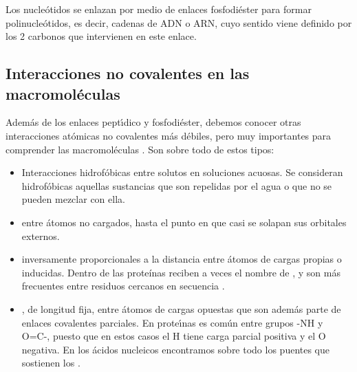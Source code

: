 Los nucle\'{o}tidos se enlazan por medio de enlaces fosfodi\'{e}ster %
para formar polinucle\'{o}tidos, es decir, cadenas de ADN o ARN, cuyo sentido viene definido por los 2 carbonos que intervienen en
este enlace. 

\subsection{Interacciones no covalentes en las macromol\'{e}culas} \label{macro1:intnocov}

Adem\'{a}s de los enlaces pept\'\i{}dico y fosfodi\'{e}ster, debemos conocer otras interacciones at\'{o}micas no covalentes 
m\'{a}s d\'{e}biles, pero muy importantes para comprender las macromol\'{e}culas \citep{Lehninger1982}. Son sobre todo de estos tipos: 

\begin{itemize}
\item Interacciones hidrof\'{o}bicas entre solutos en soluciones acuosas. 
Se consideran hidrof\'{o}bicas aquellas sustancias que son repelidas por el agua o que no se pueden mezclar con ella.

\item {} 
entre \'{a}tomos no cargados, hasta el punto en que casi se solapan sus orbitales externos.

\item {}
inversamente proporcionales a la distancia entre \'{a}tomos de cargas propias o inducidas. Dentro de las prote\'{i}nas
reciben a veces el nombre de 
,
y son m\'{a}s frecuentes entre residuos cercanos en secuencia \citep{Donald2011}.

\item {}, 
de longitud fija, entre \'{a}tomos de cargas opuestas que son adem\'{a}s parte de enlaces 
covalentes parciales. En prote\'\i{}nas es com\'{u}n entre grupos -NH y O=C-, puesto que en estos casos el H tiene 
carga parcial positiva y el O negativa. En los \'{a}cidos nucleicos encontramos sobre todo los puentes que sostienen los 
.

\end{itemize}


